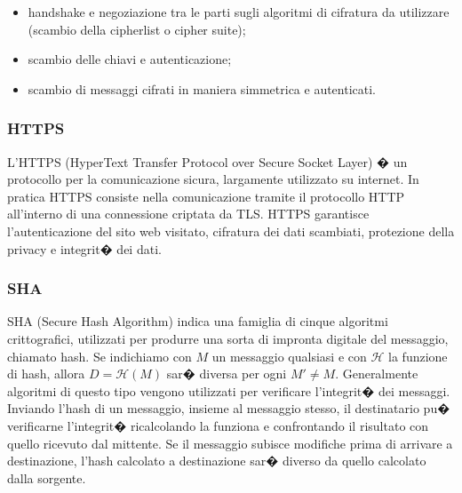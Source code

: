\begin{itemize}
\item handshake e negoziazione tra le parti sugli algoritmi di cifratura da utilizzare (scambio della cipherlist o cipher suite);
\item scambio delle chiavi e autenticazione;
\item scambio di messaggi cifrati in maniera simmetrica e autenticati.
\end{itemize}

\subsubsection{HTTPS}
L'HTTPS (HyperText Transfer Protocol over Secure Socket Layer) � un protocollo per la comunicazione sicura, largamente utilizzato su internet. In pratica HTTPS consiste nella comunicazione tramite il protocollo HTTP all'interno di una connessione criptata da TLS. HTTPS garantisce l'autenticazione del sito web visitato, cifratura dei dati scambiati, protezione della privacy e integrit� dei dati.

\subsubsection{SHA}
SHA (Secure Hash Algorithm) indica una famiglia di cinque algoritmi crittografici, utilizzati per produrre una sorta di impronta digitale del messaggio, chiamato hash. Se indichiamo con $M$ un messaggio qualsiasi e con $\mathcal{H}$ la funzione di hash, allora $D=\mathcal{H}(M)$ sar� diversa per ogni $M'\ne M$. Generalmente algoritmi di questo tipo vengono utilizzati per verificare l'integrit� dei messaggi. Inviando l'hash di un messaggio, insieme al messaggio stesso, il destinatario pu� verificarne l'integrit� ricalcolando la funziona e confrontando il risultato con quello ricevuto dal mittente. Se il messaggio subisce modifiche prima di arrivare a destinazione, l'hash calcolato a destinazione sar� diverso da quello calcolato dalla sorgente.





